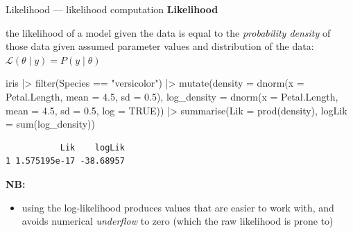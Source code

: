\documentclass[
  ignorenonframetext,
  aspectratio=169,
  t]{beamer}
\newenvironment{Shaded}{\begin{snugshade}}{\end{snugshade}}
\newcommand{\AttributeTok}[1]{\textcolor[rgb]{0.40,0.45,0.13}{#1}}
\newcommand{\ConstantTok}[1]{\textcolor[rgb]{0.56,0.35,0.01}{#1}}
\newcommand{\FloatTok}[1]{\textcolor[rgb]{0.68,0.00,0.00}{#1}}
\newcommand{\FunctionTok}[1]{\textcolor[rgb]{0.28,0.35,0.67}{#1}}
\newcommand{\NormalTok}[1]{\textcolor[rgb]{0.00,0.23,0.31}{#1}}
\newcommand{\SpecialCharTok}[1]{\textcolor[rgb]{0.37,0.37,0.37}{#1}}
\newcommand{\StringTok}[1]{\textcolor[rgb]{0.13,0.47,0.30}{#1}}
\providecommand{\tightlist}{%
  \setlength{\itemsep}{0pt}\setlength{\parskip}{0pt}}
\newcommand{\blueit}[1]{\textcolor{bluebeamer}{\emph{#1}}}
\newcommand{\bluebold}[1]{\textcolor{bluebeamer}{\textbf{#1}}}
\begin{document}
\begin{frame}[fragile]{Likelihood --- likelihood computation}
\protect{}\label{likelihood-likelihood-computation}
\bluebold{Likelihood}

the likelihood of a model given the data is equal to the
\blueit{probability density} of those data given assumed parameter
values and distribution of the data:
\(\mathcal{L}(\theta \mid y) = P(y \mid \theta)\)

\footnotesize

\begin{Shaded}
\begin{Highlighting}[]
\NormalTok{iris }\SpecialCharTok{|\textgreater{}}
  \FunctionTok{filter}\NormalTok{(Species }\SpecialCharTok{==} \StringTok{"versicolor"}\NormalTok{) }\SpecialCharTok{|\textgreater{}} 
  \FunctionTok{mutate}\NormalTok{(}\AttributeTok{density =} \FunctionTok{dnorm}\NormalTok{(}\AttributeTok{x =}\NormalTok{ Petal.Length, }\AttributeTok{mean =} \FloatTok{4.5}\NormalTok{, }\AttributeTok{sd =} \FloatTok{0.5}\NormalTok{),}
         \AttributeTok{log\_density =} \FunctionTok{dnorm}\NormalTok{(}\AttributeTok{x =}\NormalTok{ Petal.Length, }\AttributeTok{mean =} \FloatTok{4.5}\NormalTok{, }\AttributeTok{sd =} \FloatTok{0.5}\NormalTok{, }\AttributeTok{log =} \ConstantTok{TRUE}\NormalTok{)) }\SpecialCharTok{|\textgreater{}} 
  \FunctionTok{summarise}\NormalTok{(}\AttributeTok{Lik =} \FunctionTok{prod}\NormalTok{(density),}
            \AttributeTok{logLik =} \FunctionTok{sum}\NormalTok{(log\_density))}
\end{Highlighting}
\end{Shaded}

\begin{verbatim}
           Lik    logLik
1 1.575195e-17 -38.68957
\end{verbatim}

\normalsize

\textbf{NB:}

\begin{itemize}
\tightlist
\item
  using the log-likelihood produces values that are easier to work with,
  and avoids numerical \blueit{underflow} to zero (which the raw
  likelihood is prone to)
\end{itemize}
\end{frame}
\end{document}
